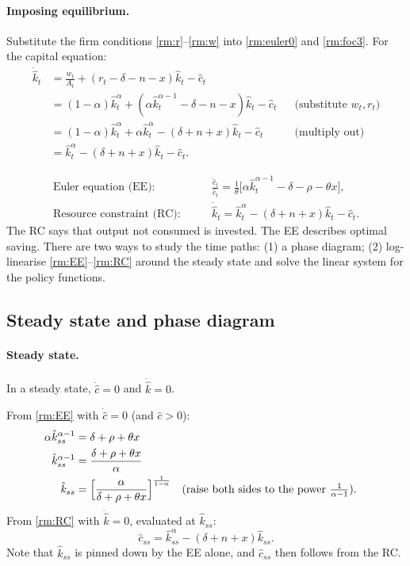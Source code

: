 \paragraph{Imposing equilibrium.} Substitute the firm conditions \eqref{rm:r}--\eqref{rm:w} into \eqref{rm:euler0} and \eqref{rm:foc3}. For the capital equation:
\begin{align*}
\dot{\hat k}_t&=\frac{w_t}{A_t}+(r_t-\delta-n-x)\hat k_t-\hat c_t\\
&=(1-\alpha)\hat k_t^\alpha+(\alpha\hat k_t^{\alpha-1}-\delta-n-x)\hat k_t-\hat c_t
&&\text{(substitute $w_t,r_t$)}\\
&=(1-\alpha)\hat k_t^\alpha+\alpha\hat k_t^{\alpha}-(\delta+n+x)\hat k_t-\hat c_t
&&\text{(multiply out)}\\
&=\hat k_t^\alpha-(\delta+n+x)\hat k_t-\hat c_t .
\end{align*}

\begin{keybox}[title={Ramsey system: 2 nonlinear ODEs in 2 unknowns $(\hat c_t,\hat k_t)$}]
\begin{align}
\text{Euler equation (EE):}&\qquad \frac{\dot{\hat c}_t}{\hat c_t}=\frac1\theta\big[\alpha\hat k_t^{\alpha-1}-\delta-\rho-\theta x\big], \label{rm:EE}\\
\text{Resource constraint (RC):}&\qquad \dot{\hat k}_t=\hat k_t^\alpha-(\delta+n+x)\hat k_t-\hat c_t . \label{rm:RC}
\end{align}
The RC says that output not consumed is invested. The EE describes optimal saving. There are two ways to study the time paths: (1) a phase diagram; (2) log-linearise \eqref{rm:EE}--\eqref{rm:RC} around the steady state and solve the linear system for the policy functions.
\end{keybox}

\subsection{Steady state and phase diagram }

\paragraph{Steady state.} In a steady state, $\dot{\hat c}=0$ and $\dot{\hat k}=0$.

From \eqref{rm:EE} with $\dot{\hat c}=0$ (and $\hat c>0$):
\begin{align}
\alpha\hat k_{ss}^{\alpha-1}&=\delta+\rho+\theta x \notag\\
\hat k_{ss}^{\alpha-1}&=\frac{\delta+\rho+\theta x}{\alpha}\notag\\
\hat k_{ss}&=\Big[\frac{\alpha}{\delta+\rho+\theta x}\Big]^{\frac1{1-\alpha}}
&&\text{(raise both sides to the power $\tfrac{1}{\alpha-1}$).} \label{rm:kss}
\end{align}
From \eqref{rm:RC} with $\dot{\hat k}=0$, evaluated at $\hat k_{ss}$:
\begin{equation}
\hat c_{ss}=\hat k_{ss}^\alpha-(\delta+n+x)\hat k_{ss}. \label{rm:css}
\end{equation}
Note that $\hat k_{ss}$ is pinned down by the EE alone, and $\hat c_{ss}$ then follows from the RC.

